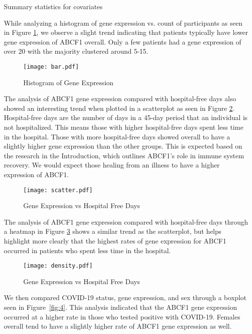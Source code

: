 \documentclass{article}
\begin{document}
\begin{table}[H]
\centering
\caption{Summary statistics for covariates}
\label{tab:summary}

\end{table}

While analyzing a histogram of gene expression vs. count of participants as seen in Figure \ref{fig:1}, we observe a slight trend indicating that patients typically have lower gene expression of ABCF1 overall. Only a few patients had a gene expression of over 20 with the majority clustered around 5-15.

\begin{figure}[H]
  \centering
  \texttt{[image: bar.pdf]}
  \caption{Histogram of Gene Expression}
  \label{fig:1}
\end{figure}

The analysis of ABCF1 gene expression compared with hospital-free days also showed an interesting trend when plotted in a scatterplot as seen in Figure \ref{fig:2}. Hospital-free days are the number of days in a 45-day period that an individual is not hospitalized. This means those with higher hospital-free days spent less time in the hospital. Those with more hospital-free days showed overall to have a slightly higher gene expression than the other groups. This is expected based on the research in the Introduction, which outlines ABCF1's role in immune system recovery. We would expect those healing from an illness to have a higher expression of ABCF1.

\begin{figure}[H]
  \centering
  \texttt{[image: scatter.pdf]}
  \caption{Gene Expression vs Hospital Free Days}
  \label{fig:2}
\end{figure}

The analysis of ABCF1 gene expression compared with hospital-free days through a heatmap in Figure \ref{fig:3} shows a similar trend as the scatterplot, but helps highlight more clearly that the highest rates of gene expression for ABCF1 occurred in patients who spent less time in the hospital.

\begin{figure}[H]
  \centering
  \texttt{[image: density.pdf]}
  \caption{Gene Expression vs Hospital Free Days}
  \label{fig:3}
\end{figure}

We then compared COVID-19 status, gene expression, and sex through a boxplot seen in Figure~\ref{fig:4}. This analysis indicated that the ABCF1 gene expression occurred at a higher rate in those who tested positive with COVID-19. Females overall tend to have a slightly higher rate of ABCF1 gene expression as well.
\end{document}
